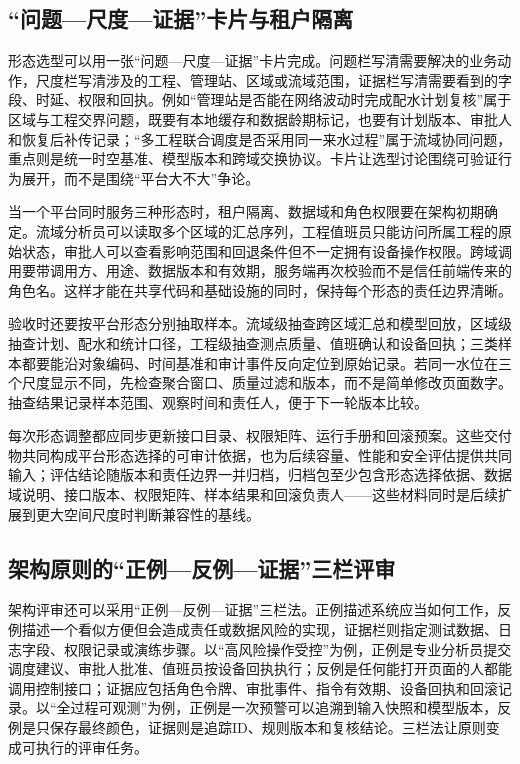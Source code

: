 \subsection{“问题—尺度—证据”卡片与租户隔离}

形态选型可以用一张“问题—尺度—证据”卡片完成。问题栏写清需要解决的业务动作，尺度栏写清涉及的工程、管理站、区域或流域范围，证据栏写清需要看到的字段、时延、权限和回执。例如“管理站是否能在网络波动时完成配水计划复核”属于区域与工程交界问题，既要有本地缓存和数据龄期标记，也要有计划版本、审批人和恢复后补传记录；“多工程联合调度是否采用同一来水过程”属于流域协同问题，重点则是统一时空基准、模型版本和跨域交换协议。卡片让选型讨论围绕可验证行为展开，而不是围绕“平台大不大”争论。

当一个平台同时服务三种形态时，租户隔离、数据域和角色权限要在架构初期确定。流域分析员可以读取多个区域的汇总序列，工程值班员只能访问所属工程的原始状态，审批人可以查看影响范围和回退条件但不一定拥有设备操作权限。跨域调用要带调用方、用途、数据版本和有效期，服务端再次校验而不是信任前端传来的角色名。这样才能在共享代码和基础设施的同时，保持每个形态的责任边界清晰。

验收时还要按平台形态分别抽取样本。流域级抽查跨区域汇总和模型回放，区域级抽查计划、配水和统计口径，工程级抽查测点质量、值班确认和设备回执；三类样本都要能沿对象编码、时间基准和审计事件反向定位到原始记录。若同一水位在三个尺度显示不同，先检查聚合窗口、质量过滤和版本，而不是简单修改页面数字。抽查结果记录样本范围、观察时间和责任人，便于下一轮版本比较。

每次形态调整都应同步更新接口目录、权限矩阵、运行手册和回滚预案。这些交付物共同构成平台形态选择的可审计依据，也为后续容量、性能和安全评估提供共同输入；评估结论随版本和责任边界一并归档，归档包至少包含形态选择依据、数据域说明、接口版本、权限矩阵、样本结果和回滚负责人——这些材料同时是后续扩展到更大空间尺度时判断兼容性的基线。

\subsection{架构原则的“正例—反例—证据”三栏评审}

架构评审还可以采用“正例—反例—证据”三栏法。正例描述系统应当如何工作，反例描述一个看似方便但会造成责任或数据风险的实现，证据栏则指定测试数据、日志字段、权限记录或演练步骤。以“高风险操作受控”为例，正例是专业分析员提交调度建议、审批人批准、值班员按设备回执执行；反例是任何能打开页面的人都能调用控制接口；证据应包括角色令牌、审批事件、指令有效期、设备回执和回滚记录。以“全过程可观测”为例，正例是一次预警可以追溯到输入快照和模型版本，反例是只保存最终颜色，证据则是追踪ID、规则版本和复核结论。三栏法让原则变成可执行的评审任务。

